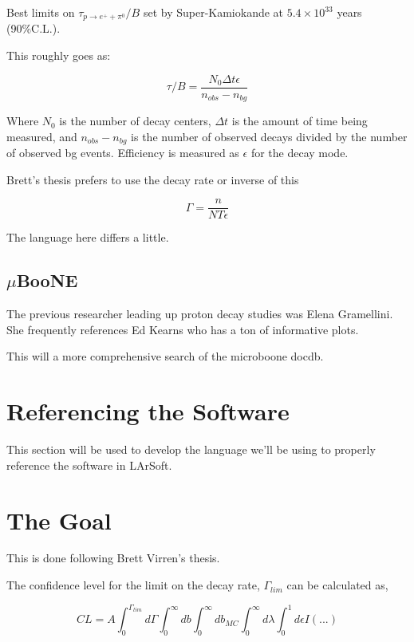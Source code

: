 \documentclass[journal, a4paper]{IEEEtran}
\begin{document}
		Best limits on $\tau_{p\rightarrow e^+ + \pi^0}/B$ set by Super-Kamiokande at $5.4\times10^{33}$ years (90\%C.L.).
		
		This roughly goes as:
		
		\begin{equation}
			\tau/B = \frac{N_0 \Delta t \epsilon}{n_{obs}-n_{bg}}
		\end{equation}
		
		Where $N_0$ is the number of decay centers, $\Delta t$ is the amount of time being measured, and $n_{obs}-n_{bg}$ is the number of observed decays divided by the number of observed bg events.
		Efficiency is measured as $\epsilon$ for the decay mode.
		
		Brett's thesis prefers to use the decay rate or inverse of this
		
		\begin{equation}
		\Gamma = \frac{n}{NT\epsilon}
		\end{equation}
		
		The language here differs a little.
		
		\subsection{$\mu$BooNE}
		
		The previous researcher leading up proton decay studies was Elena Gramellini. 
		She frequently references Ed Kearns who has a ton of informative plots.
		
		This will a more comprehensive search of the microboone docdb.
	
	\section{Referencing the Software}
		This section will be used to develop the language we'll be using to properly reference the software in LArSoft\cite{LArSoft2016}.
		
		
	\section{The Goal}
	
	This is done following Brett Virren's thesis.
	
	
	The confidence level for the limit on the decay rate, $\Gamma_{lim}$ can be calculated as,
	
	\begin{equation}
		CL = A\int_0^{\Gamma_{lim}}d\Gamma\int_0^\infty db\int_0^\infty db_{MC}\int_0^{\infty}d\lambda\int_0^1 d\epsilon I(...)
	\end{equation}
	
\end{document}
